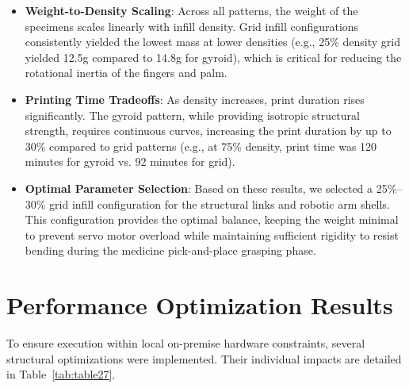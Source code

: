 \documentclass[12pt,a4paper,oneside]{report}
\begin{document}
\begin{itemize}
\item
  \textbf{Weight-to-Density Scaling}: Across all patterns, the weight of
  the specimens scales linearly with infill density. Grid infill
  configurations consistently yielded the lowest mass at lower densities
  (e.g., 25\% density grid yielded 12.5g compared to 14.8g for gyroid),
  which is critical for reducing the rotational inertia of the fingers
  and palm.
\item
  \textbf{Printing Time Tradeoffs}: As density increases, print duration
  rises significantly. The gyroid pattern, while providing isotropic
  structural strength, requires continuous curves, increasing the print
  duration by up to 30\% compared to grid patterns (e.g., at 75\%
  density, print time was 120 minutes for gyroid vs. 92 minutes for
  grid).
\item
  \textbf{Optimal Parameter Selection}: Based on these results, we
  selected a 25\%--30\% grid infill configuration for the structural
  links and robotic arm shells. This configuration provides the optimal
  balance, keeping the weight minimal to prevent servo motor
  overload while maintaining sufficient rigidity to resist bending during
  the medicine pick-and-place grasping phase.
\end{itemize}

\section{Performance Optimization
Results}\label{performance-optimization-results}

To ensure execution within local on-premise hardware constraints,
several structural optimizations were implemented. Their individual
impacts are detailed in Table~\ref{tab:table27}.
\end{document}
